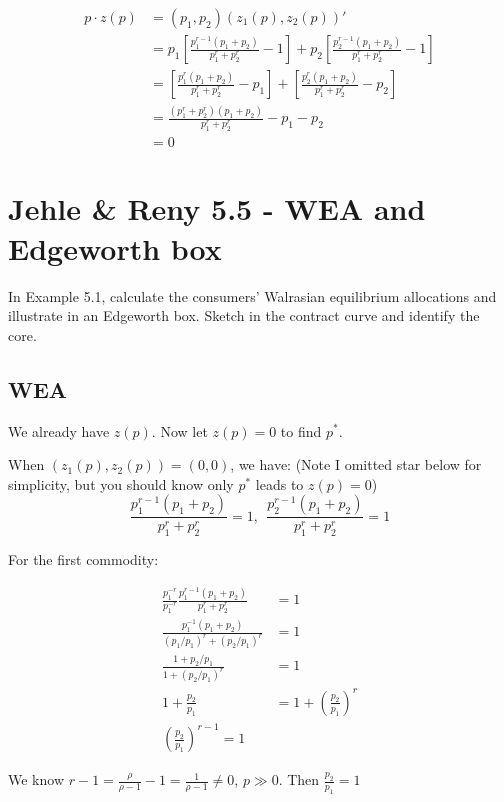 \documentclass{article}
\begin{document}
\begin{align*}
p \cdot z(p) &= (p_1,p_2)(z_1(p),z_2(p))' \\
&= p_1 [\frac{p^{r-1}_1 (p_1+p_2)}{p_1^r+p_2^r} -1] + p_2 [\frac{p^{r-1}_2 (p_1+p_2)}{p_1^r+p_2^r} -1] \\
&= [\frac{p^r_1 (p_1+p_2)}{p_1^r+p_2^r} -p_1] + [\frac{p^{r}_2 (p_1+p_2)}{p_1^r+p_2^r} -p_2]  \\
&= \frac{(p^r_1+p^r_2) (p_1+p_2)}{p_1^r+p_2^r} -p_1 - p_2 \\
&=0
\end{align*}




\section{Jehle \& Reny 5.5 - WEA and Edgeworth box}

In Example 5.1, calculate the consumers' Walrasian equilibrium allocations and illustrate in an
Edgeworth box. Sketch in the contract curve and identify the core.


\subsection{WEA}

We already have $z(p)$. Now let $z(p)=0$ to find $p^*$.

When $ (z_1(p),z_2(p)) = (0,0)$, we have:
(Note I omitted star below for simplicity, but you should know only $p^*$ leads to $z(p)=0$)
$$\frac{p^{r-1}_1 (p_1+p_2)}{p_1^r+p_2^r} =1, \ \ \frac{p^{r-1}_2 (p_1+p_2)}{p_1^r+p_2^r} =1$$

For the first commodity:

\begin{align*}
\frac{p^{-r}_1}{p^{-r}_1}\frac{p^{r-1}_1 (p_1+p_2)}{p_1^r+p_2^r} &=1 \\
\frac{p^{-1}_1 (p_1+p_2)}{(p_1/p_1)^r+(p_2/p_1)^r} &=1 \\
\frac{1+p_2/p_1}{1+(p_2/p_1)^r} &=1 \\
1+\frac{p_2}{p_1} &=1+(\frac{p_2}{p_1})^r \\
(\frac{p_2}{p_1})^{r-1} = 1
\end{align*}

We know $r-1 = \frac{\rho}{\rho-1} -1 = \frac{1}{\rho-1} \ne 0$, $p \gg 0$. Then $\frac{p_2}{p_1} = 1$
\end{document}
